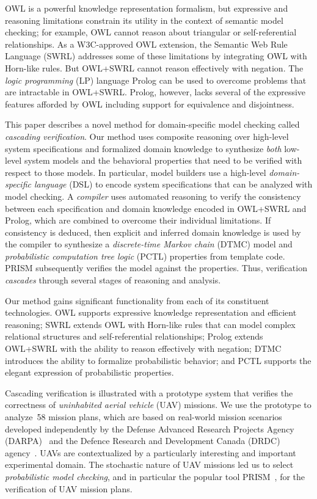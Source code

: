OWL is a powerful knowledge representation formalism, but expressive and reasoning limitations constrain its utility in the context of semantic model checking; for example, OWL cannot reason about triangular or self-referential relationships. As a W3C-approved OWL extension, the Semantic Web Rule Language (SWRL) addresses some of these limitations by integrating OWL with Horn-like rules. But OWL+SWRL cannot reason effectively with negation. The \emph{logic programming} (LP) language Prolog can be used to overcome problems that are intractable in OWL+SWRL\@. Prolog, however, lacks several of the expressive features afforded by OWL including support for equivalence and disjointness.

This paper describes a novel method for domain-specific model checking called \emph{cascading verification}. Our method uses composite reasoning over high-level system specifications and formalized domain knowledge to synthesize \emph{both} low-level system models and the behavioral properties that need to be verified with respect to those models. In particular, model builders use a high-level \emph{domain-specific language} (DSL) to encode system specifications that can be analyzed with model checking. A \emph{compiler} uses automated reasoning to verify the consistency between each specification and domain knowledge encoded in OWL+SWRL and Prolog, which are combined to overcome their individual limitations. If consistency is deduced, then explicit and inferred domain knowledge is used by the compiler to synthesize a \emph{discrete-time Markov chain} (DTMC) model and \emph{probabilistic computation tree logic} (PCTL) properties from template code. PRISM subsequently verifies the model against the properties. Thus, verification \emph{cascades} through several stages of reasoning and analysis.

Our method gains significant functionality from each of its constituent technologies. OWL supports expressive knowledge representation and efficient reasoning; SWRL extends OWL with Horn-like rules that can model complex relational structures and self-referential relationships; Prolog extends OWL+SWRL with the ability to reason effectively with negation; DTMC introduces the ability to formalize probabilistic behavior; and PCTL supports the elegant expression of probabilistic properties.

Cascading verification is illustrated with a prototype system that verifies the correctness of \emph{uninhabited aerial vehicle} (UAV) missions. We use the prototype to analyze~58 mission plans, which are based on real-world mission scenarios developed independently by the Defense Advanced Research Projects Agency (DARPA)~\cite{DARPA} and the Defence Research and Development Canada (DRDC) agency~\cite{Youngson_2004}. UAVs are contextualized by a particularly interesting and important experimental domain. The stochastic nature of UAV missions led us to select \emph{probabilistic model checking}, and in particular the popular tool PRISM~\cite{Hinton_2006}, for the verification of UAV mission plans.

